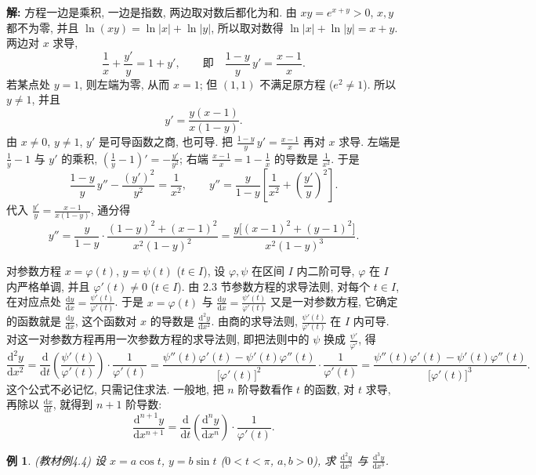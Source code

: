 \documentclass[UTF8,openany]{ctexbook}
\theoremstyle{chinesetextbook}
\newtheorem{example}{例}[section]
\newenvironment{cnsolution}{\par\indent\textbf{解:} \ignorespaces}{\par}
\newcommand{\dd}{\mathrm d}
\begin{document}
\begin{cnsolution}
方程一边是乘积, 一边是指数, 两边取对数后都化为和. 由 $xy=e^{x+y}>0$, $x,y$ 都不为零, 并且 $\ln(xy)=\ln|x|+\ln|y|$, 所以取对数得 $\ln|x|+\ln|y|=x+y$. 两边对 $x$ 求导,
\[
\frac1x+\frac{y'}y=1+y',\qquad\text{即}\quad\frac{1-y}y\,y'=\frac{x-1}x.
\]
若某点处 $y=1$, 则左端为零, 从而 $x=1$; 但 $(1,1)$ 不满足原方程 ($e^2\ne1$). 所以 $y\ne1$, 并且
\[
y'=\frac{y(x-1)}{x(1-y)}.
\]
由 $x\ne0$, $y\ne1$, $y'$ 是可导函数之商, 也可导. 把 $\displaystyle\frac{1-y}y\,y'=\frac{x-1}x$ 再对 $x$ 求导. 左端是 $\displaystyle\frac1y-1$ 与 $y'$ 的乘积, $\displaystyle\left(\frac1y-1\right)'=-\frac{y'}{y^2}$; 右端 $\displaystyle\frac{x-1}x=1-\frac1x$ 的导数是 $\displaystyle\frac1{x^2}$. 于是
\[
\frac{1-y}y\,y''-\frac{(y')^2}{y^2}=\frac1{x^2},\qquad y''=\frac y{1-y}\left[\frac1{x^2}+\left(\frac{y'}y\right)^2\right].
\]
代入 $\displaystyle\frac{y'}y=\frac{x-1}{x(1-y)}$, 通分得
\[
y''=\frac y{1-y}\cdot\frac{(1-y)^2+(x-1)^2}{x^2(1-y)^2}=\frac{y\bigl[(x-1)^2+(y-1)^2\bigr]}{x^2(1-y)^3}.
\]
\end{cnsolution}
对参数方程 $x=\varphi(t)$, $y=\psi(t)$ ($t\in I$), 设 $\varphi,\psi$ 在区间 $I$ 内二阶可导, $\varphi$ 在 $I$ 内严格单调, 并且 $\varphi'(t)\ne0$ ($t\in I$). 由 2.3 节参数方程的求导法则, 对每个 $t\in I$, 在对应点处 $\displaystyle\frac{\dd y}{\dd x}=\frac{\psi'(t)}{\varphi'(t)}$. 于是 $x=\varphi(t)$ 与 $\displaystyle\frac{\dd y}{\dd x}=\frac{\psi'(t)}{\varphi'(t)}$ 又是一对参数方程, 它确定的函数就是 $\displaystyle\frac{\dd y}{\dd x}$, 这个函数对 $x$ 的导数是 $\displaystyle\frac{\dd^2y}{\dd x^2}$. 由商的求导法则, $\displaystyle\frac{\psi'(t)}{\varphi'(t)}$ 在 $I$ 内可导. 对这一对参数方程再用一次参数方程的求导法则, 即把法则中的 $\psi$ 换成 $\displaystyle\frac{\psi'}{\varphi'}$, 得
\[
\frac{\dd^2y}{\dd x^2}=\frac{\dd}{\dd t}\left(\frac{\psi'(t)}{\varphi'(t)}\right)\cdot\frac1{\varphi'(t)}=\frac{\psi''(t)\varphi'(t)-\psi'(t)\varphi''(t)}{\bigl[\varphi'(t)\bigr]^2}\cdot\frac1{\varphi'(t)}=\frac{\psi''(t)\varphi'(t)-\psi'(t)\varphi''(t)}{\bigl[\varphi'(t)\bigr]^3}.
\]
这个公式不必记忆, 只需记住求法. 一般地, 把 $n$ 阶导数看作 $t$ 的函数, 对 $t$ 求导, 再除以 $\displaystyle\frac{\dd x}{\dd t}$, 就得到 $n+1$ 阶导数:
\[
\frac{\dd^{n+1}y}{\dd x^{n+1}}=\frac{\dd}{\dd t}\left(\frac{\dd^ny}{\dd x^n}\right)\cdot\frac1{\varphi'(t)}.
\]
\begin{example}\label{ex:c2-4-4}
\textnormal{(教材例4.4)} 设 $x=a\cos t$, $y=b\sin t$ ($0<t<\pi$, $a,b>0$), 求 $\displaystyle\frac{\dd^2y}{\dd x^2}$ 与 $\displaystyle\frac{\dd^3y}{\dd x^3}$.
\end{example}
\end{document}

